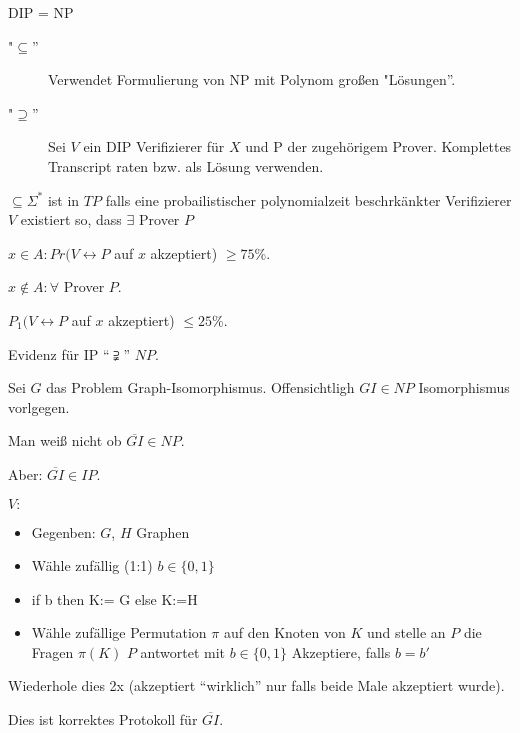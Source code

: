 \begin{satz}
DIP = NP

\begin{description}        
\item["$\subseteq$''] Verwendet Formulierung von NP mit Polynom großen "Lösungen''.
\item["$\supseteq$''] Sei $V$ ein DIP Verifizierer für $X$ und P der
  zugehörigem Prover. Komplettes Transcript raten bzw. als Lösung
  verwenden.
\end{description}
\end{satz}      

\begin{definition}
$ \subseteq \Sigma^*$ ist in $TP$
falls eine probailistischer polynomialzeit beschrkänkter Verifizierer $V$
existiert so, dass $\exists$ Prover $P$

$ x\in A : Pr(V \leftrightarrow P$ auf $x$ akzeptiert) $\geq 75\%$.

$ x \notin A : \forall$ Prover $P$.

$P_1 (V \leftrightarrow P$ auf $x$ akzeptiert) $\leq 25\%$.

Evidenz für IP ``$\supsetneqq$'' $NP$.

Sei $G$ das Problem Graph-Isomorphismus. Offensichtligh $GI \in NP$ Isomorphismus vorlgegen.

Man weiß nicht ob $\overline{GI} \in NP$.

Aber: $\overline{GI} \in IP$.

$V:$

\begin{itemize}
\item Gegenben: $G$,  $H$ Graphen
\item Wähle zufällig (1:1) $b\in \{0,1\}$
\item if b then K:= G else K:=H
\item Wähle zufällige Permutation $\pi$ auf den Knoten von $K$ und stelle an $P$ die Fragen $\pi(K)$ $P$ antwortet mit $b\in \{0,1\}$
Akzeptiere, falls $b=b'$
\end{itemize}

Wiederhole dies 2x (akzeptiert ``wirklich'' nur falls beide Male akzeptiert wurde).

Dies ist korrektes Protokoll für $\overline{GI}$.

\end{definition}


